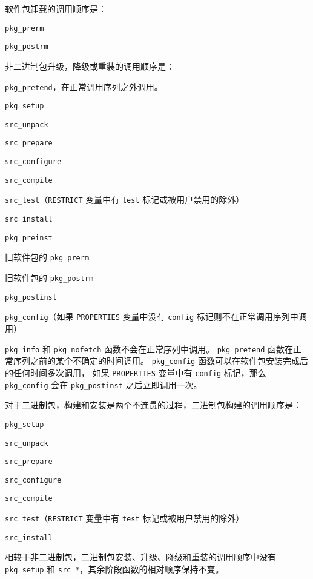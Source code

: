 软件包卸载的调用顺序是：

\begin{compactitem}
\item \texttt{pkg_prerm}
\item \texttt{pkg_postrm}
\end{compactitem}

非二进制包升级，降级或重装的调用顺序是：

\begin{compactitem}
\item \texttt{pkg_pretend}，在正常调用序列之外调用。
\item \texttt{pkg_setup}
\item \texttt{src_unpack}
\item \texttt{src_prepare}
\item \texttt{src_configure}
\item \texttt{src_compile}
\item \texttt{src_test}（\texttt{RESTRICT} 变量中有 \texttt{test} 标记或被用户禁用的除外）
\item \texttt{src_install}
\item \texttt{pkg_preinst}
\item 旧软件包的 \texttt{pkg_prerm}
\item 旧软件包的 \texttt{pkg_postrm}
\item \texttt{pkg_postinst}
\item \texttt{pkg_config}（如果 \texttt{PROPERTIES} 变量中没有 \texttt{config} 标记则不在正常调用序列中调用）
\end{compactitem}

\texttt{pkg_info} 和 \texttt{pkg_nofetch} 函数不会在正常序列中调用。
\texttt{pkg_pretend} 函数在正常序列之前的某个不确定的时间调用。
\texttt{pkg_config} 函数可以在软件包安装完成后的任何时间多次调用，
如果 \texttt{PROPERTIES} 变量中有 \texttt{config} 标记，那么 \texttt{pkg_config}
会在 \texttt{pkg_postinst} 之后立即调用一次。

对于二进制包，构建和安装是两个不连贯的过程，二进制包构建的调用顺序是：
\begin{compactitem}
\item \texttt{pkg_setup}
\item \texttt{src_unpack}
\item \texttt{src_prepare}
\item \texttt{src_configure}
\item \texttt{src_compile}
\item \texttt{src_test}（\texttt{RESTRICT} 变量中有 \texttt{test} 标记或被用户禁用的除外）
\item \texttt{src_install}
\end{compactitem}

相较于非二进制包，二进制包安装、升级、降级和重装的调用顺序中没有 \texttt{pkg_setup}
和 \texttt{src_*}，其余阶段函数的相对顺序保持不变。


